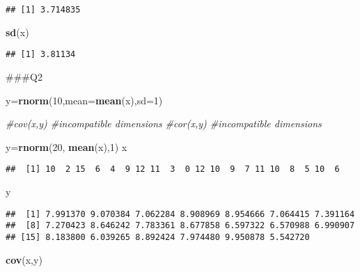 \documentclass[]{article}
\newenvironment{Shaded}{\begin{snugshade}}{\end{snugshade}}
\newcommand{\CommentTok}[1]{\textcolor[rgb]{0.56,0.35,0.01}{\textit{#1}}}
\newcommand{\DataTypeTok}[1]{\textcolor[rgb]{0.13,0.29,0.53}{#1}}
\newcommand{\DecValTok}[1]{\textcolor[rgb]{0.00,0.00,0.81}{#1}}
\newcommand{\KeywordTok}[1]{\textcolor[rgb]{0.13,0.29,0.53}{\textbf{#1}}}
\newcommand{\NormalTok}[1]{#1}
\begin{document}
\begin{verbatim}
## [1] 3.714835
\end{verbatim}

\begin{Shaded}
\begin{Highlighting}[]
\KeywordTok{sd}\NormalTok{(x)}
\end{Highlighting}
\end{Shaded}

\begin{verbatim}
## [1] 3.81134
\end{verbatim}

\#\#\#Q2

\begin{Shaded}
\begin{Highlighting}[]
\NormalTok{y=}\KeywordTok{rnorm}\NormalTok{(}\DecValTok{10}\NormalTok{,}\DataTypeTok{mean=}\KeywordTok{mean}\NormalTok{(x),}\DataTypeTok{sd=}\DecValTok{1}\NormalTok{)}

 \CommentTok{#cov(x,y) #incompatible dimensions}
 \CommentTok{#cor(x,y) #incompatible dimensions}
 
\NormalTok{y=}\KeywordTok{rnorm}\NormalTok{(}\DecValTok{20}\NormalTok{, }\KeywordTok{mean}\NormalTok{(x),}\DecValTok{1}\NormalTok{)}
\NormalTok{x}
\end{Highlighting}
\end{Shaded}

\begin{verbatim}
##  [1] 10  2 15  6  4  9 12 11  3  0 12 10  9  7 11 10  8  5 10  6
\end{verbatim}

\begin{Shaded}
\begin{Highlighting}[]
\NormalTok{y}
\end{Highlighting}
\end{Shaded}

\begin{verbatim}
##  [1] 7.991370 9.070384 7.062284 8.908969 8.954666 7.064415 7.391164
##  [8] 7.270423 8.646242 7.783361 8.677858 6.597322 6.570988 6.990907
## [15] 8.183800 6.039265 8.892424 7.974480 9.950878 5.542720
\end{verbatim}

\begin{Shaded}
\begin{Highlighting}[]
\KeywordTok{cov}\NormalTok{(x,y)}
\end{Highlighting}
\end{Shaded}
\end{document}

